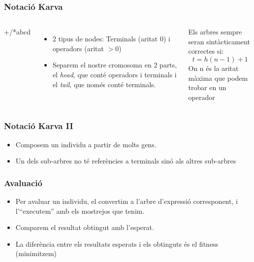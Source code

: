 \documentclass{beamer}
\begin{document}
\begin{frame}
	\frametitle{Notació Karva}
	\begin{columns}[c]
		\begin{center}
		+/*abcd
		\end{center}

		\begin{itemize}
			\item 2 tipus de nodes: Terminals (aritat 0) i operadors (aritat
			$>0$)
			\item Separem el nostre cromosoma en 2 parts, el \emph{head}, que
			conté operadors i terminals i el \emph{tail}, que només conté
			terminals.
		\end{itemize}
		\begin{block}{Els arbres sempre seran sintàcticament correctes si:}
			$$ t =  h (n-1) + 1 $$
			On n és la aritat màxima que podem trobar en un operador
		\end{block}
	\end{columns}
\end{frame}

\begin{frame}
	\frametitle{Notació Karva II}
	\begin{itemize}
		\item Composem un individu a partir de molts gens.
		\item Un dels sub-arbres no té referències a terminals sinó als altres sub-arbres
	\end{itemize}
\end{frame}

\begin{frame}
	\frametitle{Avaluació}
	\begin{itemize}
		\item Per avaluar un individu, el convertim a l'arbre d'expressió corresponent, i
			l'``executem'' amb els mostrejos que tenim.
		\item Comparem el resultat obtingut amb l'esperat.
		\item La diferència entre els resultats esperats i els obtinguts és el fitness (minimitzem)
	\end{itemize}
\end{frame}
\end{document}
